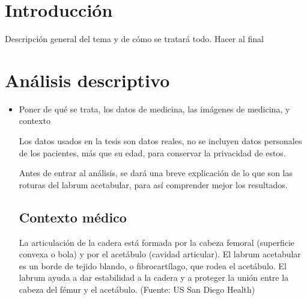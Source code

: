 \documentclass{book}
\begin{document}
	

	\chapter{Introducción}  
	Descripción general del tema y de cómo se tratará todo. Hacer al final
	
	\chapter{Análisis descriptivo} 
		\begin{itemize}
			\item Poner de qué se trata, los datos de medicina, las imágenes de medicina, y contexto
			
			Los datos usados en la tesis son datos reales, no se incluyen datos personales de los pacientes, más que su edad, para conservar la privacidad de estos. 
			
			
			
			Antes de entrar al análisis, se dará una breve explicación de lo que son las roturas del labrum acetabular, para así comprender mejor los resultados.
			
	        \section{Contexto médico}
	        La articulación de la cadera está formada por la cabeza femoral (superficie convexa o bola) y por el acetábulo (cavidad articular). El labrum acetabular es un borde de tejido blando, o fibrocartílago, que rodea el acetábulo. El labrum ayuda a dar estabilidad a la cadera y a proteger la unión entre la cabeza del fémur y el acetábulo. (Fuente: US San Diego Health) 
	        
	      

\end{itemize}
\end{document}
